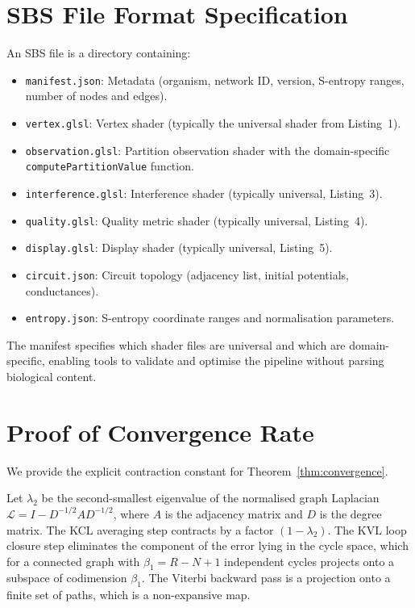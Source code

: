 \documentclass[11pt,twocolumn,a4paper]{article}
\begin{document}

\appendix

\section{SBS File Format Specification}
\label{app:format}

An SBS file is a directory containing:

\begin{itemize}[leftmargin=*,nosep]
\item \texttt{manifest.json}: Metadata (organism, network ID, version,
  S-entropy ranges, number of nodes and edges).
\item \texttt{vertex.glsl}: Vertex shader (typically the universal
  shader from Listing~1).
\item \texttt{observation.glsl}: Partition observation shader with the
  domain-specific \texttt{computePartitionValue} function.
\item \texttt{interference.glsl}: Interference shader (typically
  universal, Listing~3).
\item \texttt{quality.glsl}: Quality metric shader (typically
  universal, Listing~4).
\item \texttt{display.glsl}: Display shader (typically universal,
  Listing~5).
\item \texttt{circuit.json}: Circuit topology (adjacency list, initial
  potentials, conductances).
\item \texttt{entropy.json}: S-entropy coordinate ranges and
  normalisation parameters.
\end{itemize}

The manifest specifies which shader files are universal and which are
domain-specific, enabling tools to validate and optimise the pipeline
without parsing biological content.

\section{Proof of Convergence Rate}
\label{app:convergence-rate}

We provide the explicit contraction constant for
Theorem~\ref{thm:convergence}.

Let $\lambda_2$ be the second-smallest eigenvalue of the normalised
graph Laplacian $\mathcal{L} = I - D^{-1/2}AD^{-1/2}$, where $A$ is
the adjacency matrix and $D$ is the degree matrix.  The KCL averaging
step contracts by a factor $(1 - \lambda_2)$.  The KVL loop closure
step eliminates the component of the error lying in the cycle space,
which for a connected graph with $\beta_1 = R - N + 1$ independent
cycles projects onto a subspace of codimension $\beta_1$.  The Viterbi
backward pass is a projection onto a finite set of paths, which is
a non-expansive map.
\end{document}
